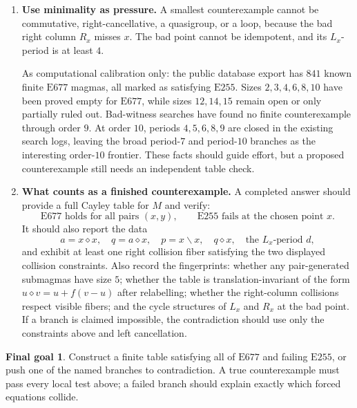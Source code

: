 \documentclass[12pt]{article}
\newcommand{\op}{\diamond}
\newcommand{\E}[1]{\mathrm{E#1}}
\theoremstyle{definition}
\newtheorem*{goal}{Final goal}
\begin{document}
\begin{enumerate}[label=\textbf{\arabic*.}]
\item \textbf{Use minimality as pressure.}
A smallest counterexample cannot be commutative, right-cancellative, a quasigroup, or a
loop, because the bad right column $R_x$ misses $x$.  The bad point cannot be idempotent,
and its $L_x$-period is at least $4$.

As computational calibration only: the public database export has $841$ known finite
$\E{677}$ magmas, all marked as satisfying $\E{255}$.  Sizes $2,3,4,6,8,10$ have been
proved empty for $\E{677}$, while sizes $12,14,15$ remain open or only partially ruled
out.  Bad-witness searches have found no finite counterexample through order $9$.  At
order $10$, periods $4,5,6,8,9$ are closed in the existing search logs, leaving the broad
period-$7$ and period-$10$ branches as the interesting order-$10$ frontier.  These facts
should guide effort, but a proposed counterexample still needs an independent table
check.

\item \textbf{What counts as a finished counterexample.}
A completed answer should provide a full Cayley table for $M$ and verify:
\[
\text{$\E{677}$ holds for all pairs }(x,y),
\qquad
\text{$\E{255}$ fails at the chosen point }x.
\]
It should also report the data
\[
a=x\op x,
\quad
q=a\op x,
\quad
p=x\backslash x,
\quad
q\op x,
\quad
\text{the $L_x$-period }d,
\]
and exhibit at least one right collision fiber satisfying the two displayed collision constraints.
Also record the fingerprints: whether any pair-generated submagmas have size $5$; whether
the table is translation-invariant of the form $u\op v=u+f(v-u)$ after relabelling;
whether the right-column collisions respect visible fibers; and the cycle structures of
$L_x$ and $R_x$ at the bad point.  If a branch is claimed impossible, the contradiction
should use only the constraints above and left cancellation.
\end{enumerate}

\begin{goal}
Construct a finite table satisfying all of $\E{677}$ and failing $\E{255}$, or push one
of the named branches to contradiction.  A true counterexample must pass every local
test above; a failed branch should explain exactly which forced equations collide.
\end{goal}
\end{document}
